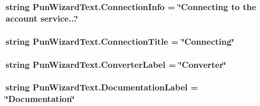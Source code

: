 \subsubsection[{\texorpdfstring{Connection\+Info}{ConnectionInfo}}]{\setlength{\rightskip}{0pt plus 5cm}string Pun\+Wizard\+Text.\+Connection\+Info = \char`\"{}Connecting to the account service...\char`\"{}}\hypertarget{class_pun_wizard_text_a1a379fc2eeae758a101de927a5ed0d8f}{}\label{class_pun_wizard_text_a1a379fc2eeae758a101de927a5ed0d8f}
\subsubsection[{\texorpdfstring{Connection\+Title}{ConnectionTitle}}]{\setlength{\rightskip}{0pt plus 5cm}string Pun\+Wizard\+Text.\+Connection\+Title = \char`\"{}Connecting\char`\"{}}\hypertarget{class_pun_wizard_text_a4c42b8421a2f4d75e522bb0bd2309f43}{}\label{class_pun_wizard_text_a4c42b8421a2f4d75e522bb0bd2309f43}
\subsubsection[{\texorpdfstring{Converter\+Label}{ConverterLabel}}]{\setlength{\rightskip}{0pt plus 5cm}string Pun\+Wizard\+Text.\+Converter\+Label = \char`\"{}Converter\char`\"{}}\hypertarget{class_pun_wizard_text_abcf53e463461d4e0d0828d904f75fb13}{}\label{class_pun_wizard_text_abcf53e463461d4e0d0828d904f75fb13}
\subsubsection[{\texorpdfstring{Documentation\+Label}{DocumentationLabel}}]{\setlength{\rightskip}{0pt plus 5cm}string Pun\+Wizard\+Text.\+Documentation\+Label = \char`\"{}Documentation\char`\"{}}\hypertarget{class_pun_wizard_text_ae1dab9164063a1d996519de0d3c157d5}{}\label{class_pun_wizard_text_ae1dab9164063a1d996519de0d3c157d5}
